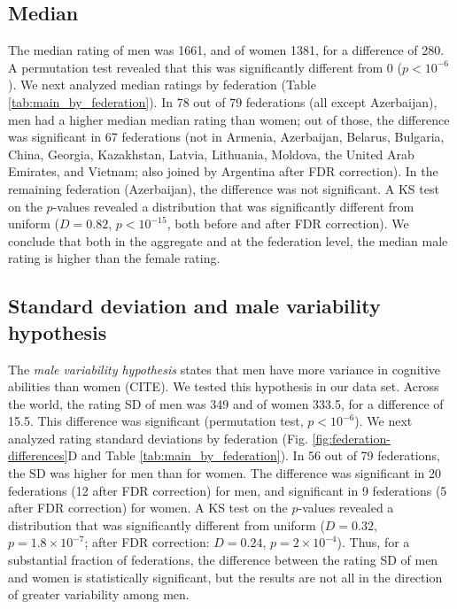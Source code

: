 \documentclass[9pt,twocolumn,twoside,lineno]{pnas-new}
\begin{document}
\subsection*{Median}
The median rating of men was 1661, and of women 1381, for a difference of 280.  A permutation test revealed that this was significantly different from 0 ($p < 10^{-6}$). We next analyzed  median ratings by federation (Table \ref{tab:main_by_federation}).  In 78 out of 79 federations (all except Azerbaijan), men had a higher median median rating than women; out of those, the difference was significant in 67 federations (not in Armenia, Azerbaijan, Belarus, Bulgaria, China, Georgia, Kazakhstan, Latvia, Lithuania, Moldova, the United Arab Emirates, and Vietnam; also joined by Argentina after FDR correction). In the remaining federation (Azerbaijan), the difference was not significant. A KS test on the $p$-values revealed a distribution that was significantly different from uniform ($D=0.82$, $p < 10^{-15}$, both before and after FDR correction). We conclude that both in the aggregate and at the federation level, the median male rating is higher than the female rating.


\subsection*{Standard deviation and male variability hypothesis}
The {\it male variability hypothesis} states that men have more variance in cognitive abilities than women (CITE). We tested this hypothesis in our data set. Across the world, the rating SD of men was 349 and of women 333.5, for a difference of 15.5. This difference was significant (permutation test, $p < 10^{-6}$). We next analyzed rating standard deviations by federation (Fig. \ref{fig:federation-differences}D and Table \ref{tab:main_by_federation}). In 56 out of 79 federations, the SD was higher for men than for women. The difference was significant in 20 federations (12 after FDR correction) for men, and significant in 9 federations (5 after FDR correction) for women. A KS test on the $p$-values revealed a distribution that was significantly different from uniform ($D = 0.32$, $p = 1.8\times 10^{-7}$; after FDR correction: $D= 0.24$, $p=2\times 10^{-4}$). Thus, for a substantial fraction of federations, the difference between the rating SD of men and women is statistically significant, but the results are not all in the direction of greater variability among men.
\end{document}
